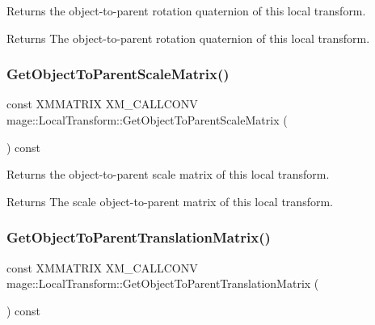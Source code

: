 Returns the object-\/to-\/parent rotation quaternion of this local transform.

\begin{DoxyReturn}{Returns}
The object-\/to-\/parent rotation quaternion of this local transform. 
\end{DoxyReturn}
\mbox{\label{classmage_1_1_local_transform_acd4fda032325f52cb668fc4733c6bc04}} 
\subsubsection{\texorpdfstring{Get\+Object\+To\+Parent\+Scale\+Matrix()}{GetObjectToParentScaleMatrix()}}
{\footnotesize\ttfamily const X\+M\+M\+A\+T\+R\+IX X\+M\+\_\+\+C\+A\+L\+L\+C\+O\+NV mage\+::\+Local\+Transform\+::\+Get\+Object\+To\+Parent\+Scale\+Matrix (\begin{DoxyParamCaption}{ }\end{DoxyParamCaption}) const\hspace{0.3cm}{\ttfamily [noexcept]}}

Returns the object-\/to-\/parent scale matrix of this local transform.

\begin{DoxyReturn}{Returns}
The scale object-\/to-\/parent matrix of this local transform. 
\end{DoxyReturn}
\mbox{\label{classmage_1_1_local_transform_a417c97411f3214119a1e7298de4b1631}} 
\subsubsection{\texorpdfstring{Get\+Object\+To\+Parent\+Translation\+Matrix()}{GetObjectToParentTranslationMatrix()}}
{\footnotesize\ttfamily const X\+M\+M\+A\+T\+R\+IX X\+M\+\_\+\+C\+A\+L\+L\+C\+O\+NV mage\+::\+Local\+Transform\+::\+Get\+Object\+To\+Parent\+Translation\+Matrix (\begin{DoxyParamCaption}{ }\end{DoxyParamCaption}) const\hspace{0.3cm}{\ttfamily [noexcept]}}

